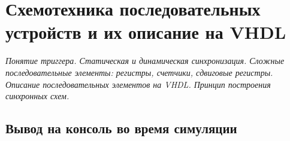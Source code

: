 \chapter{Схемотехника последовательных устройств и их описание на VHDL}

\emph{Понятие триггера. Статическая и динамическая синхронизация. Сложные последовательные элементы: регистры, счетчики, сдвиговые регистры. Описание последовательных элементов на VHDL. Принцип построения синхронных схем.}

\section{Вывод на консоль во время симуляции}
